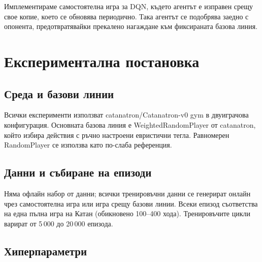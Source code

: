 \documentclass[11pt,a4paper]{article}
\begin{document}
Имплементираме самостоятелна игра за DQN, където агентът е изправен срещу свое копие, което се обновява периодично. Така агентът се подобрява заедно с опонента, предотвратявайки прекалено нагаждане към фиксираната базова линия.

\section{Експериментална постановка}

\subsection{Среда и базови линии}

Всички експерименти използват {catanatron/Catanatron-v0} gym в
двуиграчова конфигурация. Основната базова линия е WeightedRandomPlayer
от {catanatron}, който избира действия с ръчно настроени евристични
тегла. Равномерен RandomPlayer се използва като по-слаба референция.

\subsection{Данни и събиране на епизоди}

Няма офлайн набор от данни; всички тренировъчни данни се генерират онлайн чрез
самостоятелна игра или игра срещу базови линии. Всеки епизод съответства на
една пълна игра на Катан (обикновено 100--400 хода). Тренировъчите цикли
варират от 5\,000 до 20\,000 епизода.

\subsection{Хиперпараметри}
\end{document}
